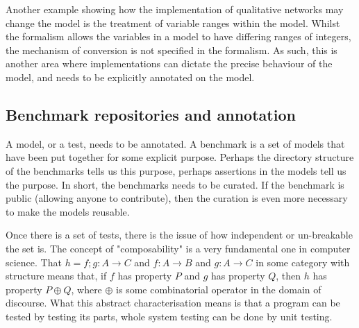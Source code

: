 \documentclass[conference]{IEEEtran}
\begin{document}
Another example showing how the implementation of qualitative networks
may change the model is the treatment of variable ranges within the
model.  Whilst the formalism allows the variables in a model to have
differing ranges of integers, the mechanism of conversion is not
specified in the formalism. As such, this is another area where
implementations can dictate the precise behaviour of the model, and
needs to be explicitly annotated on the model.



\subsection{Benchmark repositories and annotation}


A model, or a test, needs to be annotated. A benchmark is a set of
models that have been put together for some explicit purpose. Perhaps
the directory structure of the benchmarks tells us this purpose,
perhaps assertions in the models tell us the purpose. In short, the
benchmarks needs to be curated.  If the benchmark is public (allowing
anyone to contribute), then the curation is even more necessary to
make the models reusable.

Once there is a set of tests, there is the issue of how independent or
un-breakable the set is.  The concept of "composability" is a very
fundamental one in computer science.  That $h = f;g : A \rightarrow C$
and $f : A \rightarrow B$ and $g : A \rightarrow C$ in some category
with structure means that, if $f$ has property $P$ and $g$ has
property $Q$, then $h$ has property $P \oplus Q$, where $\oplus$ is
some combinatorial operator in the domain of discourse. What this
abstract characterisation means is that a program can be tested by
testing its parts, whole system testing can be done by unit testing.
\end{document}
